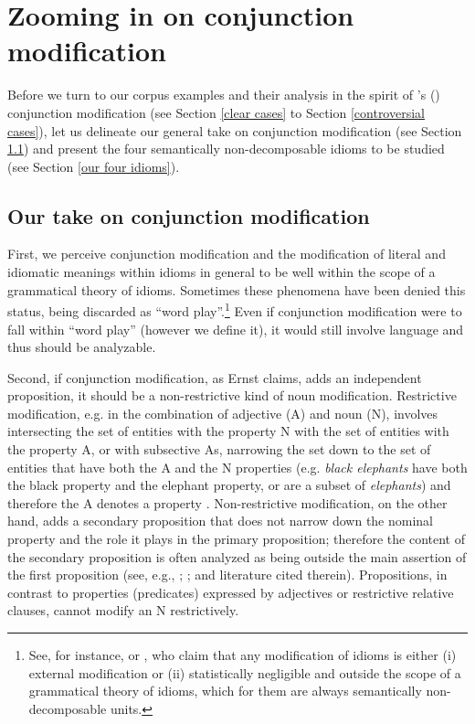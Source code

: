 \documentclass[output=paper]{langsci/langscibook}
\begin{document}
\section{Zooming in on conjunction modification} \label{Zoom ConjMod}

Before we turn to our corpus examples and their analysis in the spirit of \citeauthor{ernst81}'s (\citeyear{ernst81}) conjunction modification (see Section \ref{clear cases} to Section \ref{controversial cases}), let us delineate our general take on conjunction modification (see Section \ref{our take}) and present the four semantically non-decomposable idioms to be studied (see Section \ref{our four idioms}).



\subsection{Our take on conjunction modification} \label{our take}

First, we perceive conjunction modification and the modification of literal and idiomatic meanings within idioms in general to be well within the scope of a grammatical theory of idioms. Sometimes these phenomena have been denied this status, being discarded as ``word play''.\footnote{See, for instance, \citet{schenk95} or \citet{nicolas95}, who claim that any modification of idioms is either (i) external modification or (ii) statistically negligible and outside the scope of a grammatical theory of idioms, which for them are always semantically non-decomposable units.}
Even if conjunction modification were to fall within ``word play'' (however we define it), it would still involve language and thus should be analyzable.

\begin{sloppypar}
  Second, if conjunction modification, as Ernst claims, adds an
  independent prop\-osition, it should be a non-restrictive kind of
  noun modification. Restrictive modification, e.g. in the combination
  of adjective (A) and noun (N), involves intersecting the set of
  entities with the property N with the set of entities with the
  property A, or with subsective As, narrowing the set down to the set
  of entities that have both the A and the N properties
  (e.g. \textit{black elephants} have both the black property and the
  elephant property, or are a subset of \textit{elephants}) and
  therefore the A denotes a property \citep[see,
  e.g.,][]{kamppartee}. Non-restrictive modification, on the other
  hand, adds a secondary proposition that does not narrow down the
  nominal property and the role it plays in the primary proposition;
  therefore the content of the secondary proposition is often analyzed
  as being outside the main assertion of the first
  proposition %
  (see, e.g., \citealt{morzyckibook}; \citealt{mcnally16}; and
  literature cited therein). Propositions, in contrast to properties
  (predicates) expressed by adjectives or restrictive relative
  clauses, cannot modify an N restrictively.
\end{sloppypar}
\end{document}
